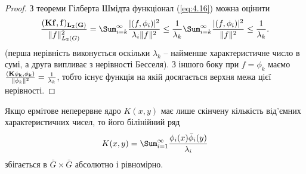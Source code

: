 \begin{proof}
    З теореми Гілберта Шмідта функціонал (\ref{eq:4.16}) можна оцінити \[ \dfrac{(\bf{K}f, f)_{L_2(G)}}{\|f\|_{L_2(G)}^2} = \Sum_{i=k}^\infty \dfrac{|(f, \phi_i)|^2}{\lambda_i\|f\|^2} \le \dfrac{1}{\lambda_k} \Sum_{i=k}^\infty \dfrac{|(f, \phi_i)|^2}{\|f\|^2} \le \dfrac{1}{\lambda_k}. \] (перша нерівність виконується оскільки $\lambda_k$ -- найменше характеристичне число в сумі, а друга випливає з нерівності Бесселя). З іншого боку при $f = \phi_k$ маємо $\frac{(\bf{K}\phi_k, \phi_k)}{\|\phi_k\|^2} = \frac{1}{\lambda_k}$, тобто існує функція на якій досягається верхня межа цієї нерівності.
\end{proof}

\begin{theorem} 
    Якщо ермітове неперервне ядро $K(x, y)$ має лише скінчену кількість від’ємних характеристичних чисел, то його білінійний ряд 
    \begin{equation}
        \label{eq:4.17}
        K(x,y)=\Sum_{i=1}^\infty\dfrac{\phi_i(x)\bar\phi_i(y)}{\lambda_i}
    \end{equation}
    збігається в $\bar G\times\bar G$ абсолютно і рівномірно.
\end{theorem}

